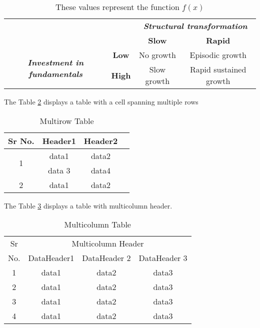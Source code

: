 \documentclass[11pt,a4paper]{article}
\begin{document}
\begin{table}[H]
\def\arraystretch {1.5}
\centering


\begin{tabular}{|c|c|c|c|}
\hline 
\hline 
\multicolumn{2}{|c|}{} & \multicolumn{2}{|c|}{\textbf{\textit{Structural transformation}}} \\ 
\cline{3-4} 
\multicolumn{2}{|c|}{} & \textbf{Slow} & \textbf{Rapid} \\ 
\hline 
\multirow{2}{*}{\textbf{\textit{Investment in fundamentals}}}  & \textbf{Low} &  No growth & Episodic growth \\ 
\cline{2-4}
											& \textbf{High}  & Slow growth & Rapid sustained growth \\ 
\hline
\hline 
\end{tabular} 

\caption{These values represent the function $f(x)$}
\label{tab: data 1}
\end{table}


The Table \ref{multirow_table} displays a table with a cell spanning multiple rows

		\begin{table} [ht]
			\centering
			\scalebox{1.5}
			{
			\begin{tabular}{|c|c|c|c|}
			\hline
			Sr No. & Header1 & Header2 \\
			\hline
			\multirow{2}{*}{1} & data1 & data2 \\
									 & data 3 & data4 \\
			\hline
			2 & data1 & data2 \\
			\hline
			\end{tabular}						
			}
			\caption{Multirow Table}
			\label{multirow_table}
		\end{table}


The Table \ref{multicolumn_table} displays a table with multicolumn header. 

\begin{table} [ht]
	\centering
	\begin{tabular}{|c|c|c|c|}
		\hline
		Sr & \multicolumn{3}{c|}{Multicolumn Header} \\
		\cline{2-4}
		No. & DataHeader1 & DataHeader 2 & DataHeader 3 \\
		\hline 
		1 & data1 & data2 & data3 \\
		\hline
		2 & data1 & data2 & data3 \\
		\hline
		3 & data1 & data2 & data3 \\
		\hline
		4 & data1 & data2 & data3 \\
		\hline
	\end{tabular}
	\caption{Multicolumn Table}
	\label{multicolumn_table}
\end{table}
\end{document}
